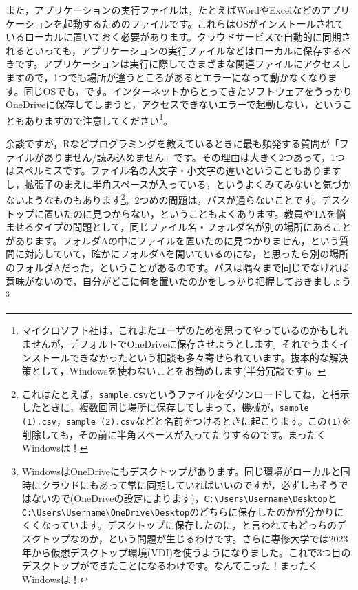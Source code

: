 \documentclass{ltjsbook}
\begin{document}
また，アプリケーションの実行ファイルは，たとえばWordやExcelなどのアプリケーションを起動するためのファイルです。これらはOSがインストールされているローカルに置いておく必要があります。クラウドサービスで自動的に同期されるといっても，アプリケーションの実行ファイルなどはローカルに保存するべきです。アプリケーションは実行に際してさまざまな関連ファイルにアクセスしますので，1つでも場所が違うところがあるとエラーになって動かなくなります。同じOSでも，です。インターネットからとってきたソフトウェアをうっかりOneDriveに保存してしまうと，アクセスできないエラーで起動しない，ということもありますので注意してください\footnote{マイクロソフト社は，これまたユーザのためを思ってやっているのかもしれませんが，デフォルトでOneDriveに保存させようとします。それでうまくインストールできなかったという相談も多々寄せられています。抜本的な解決策として，Windowsを使わないことをお勧めします(半分冗談です)。}。

余談ですが，Rなどプログラミングを教えているときに最も頻発する質問が「ファイルがありません/読み込めません」です。その理由は大きく2つあって，1つはスペルミスです。ファイル名の大文字・小文字の違いということもありますし，拡張子のまえに半角スペースが入っている，というよくみてみないと気づかないようなものもあります\footnote{これはたとえば，\verb|sample.csv|というファイルをダウンロードしてね，と指示したときに，複数回同じ場所に保存してしまって，機械が，\verb|sample (1).csv|，\verb|sample (2).csv|などと名前をつけるときに起こります。この\verb|(1)|を削除しても，その前に半角スペースが入ってたりするのです。まったくWindowsは！}。2つめの問題は，パスが通らないことです。デスクトップに置いたのに見つからない，ということもよくあります。教員やTAを悩ませるタイプの問題として，同じファイル名・フォルダ名が別の場所にあることがあります。フォルダAの中にファイルを置いたのに見つかりません，という質問に対応していて，確かにフォルダAを開いているのにな，と思ったら別の場所のフォルダAだった，ということがあるのです。パスは隅々まで同じでなければ意味がないので，自分がどこに何を置いたのかをしっかり把握しておきましょう\footnote{WindowsはOneDriveにもデスクトップがあります。同じ環境がローカルと同時にクラウドにもあって常に同期していればいいのですが，必ずしもそうではないので(OneDriveの設定によります)，\verb|C:\Users\Username\Desktop|と\verb|C:\Users\Username\OneDrive\Desktop|のどちらに保存したのかが分かりにくくなっています。デスクトップに保存したのに，と言われてもどっちのデスクトップなのか，という問題が生じるわけです。さらに専修大学では2023年から仮想デスクトップ環境(VDI)を使うようになりました。これで3つ目のデスクトップができたことになるわけです。なんてこった！まったくWindowsは！}
\end{document}
